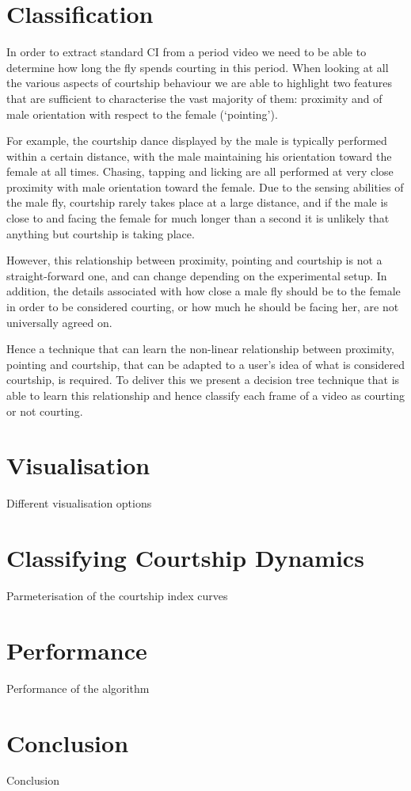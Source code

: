 \documentclass[twocolumn]{article}
\begin{document}
\section{Classification}

In order to extract standard CI from a period video we need to be able to determine how long the fly spends courting in this period. When looking at all the various aspects of courtship behaviour we are able to highlight two features that are sufficient to characterise the vast majority of them: proximity and of male orientation with respect to the female (`pointing'). 

For example, the courtship dance displayed by the male is typically performed within a certain distance, with the male maintaining his orientation toward the female at all times. Chasing, tapping and licking are all performed at very close proximity with male orientation toward the female. Due to the sensing abilities of the male fly, courtship rarely takes place at a large distance, and if the male is close to and facing the female for much longer than a second it is unlikely that anything but courtship is taking place.

However, this relationship between proximity, pointing and courtship is not a straight-forward one, and can change depending on the experimental setup. In addition, the details associated with how close a male fly should be to the female in order to be considered courting, or how much he should be facing her, are not universally agreed on. 

Hence a technique that can learn the non-linear relationship between proximity, pointing and courtship, that can be adapted to a user's idea of what is considered courtship, is required. To deliver this we present a decision tree technique that is able to learn this relationship and hence classify each frame of a video as courting or not courting. 

\section{Visualisation}

Different visualisation options

\section{Classifying Courtship Dynamics}

Parmeterisation of the courtship index curves

\section{Performance}

Performance of the algorithm

\section{Conclusion}
Conclusion
\end{document}
